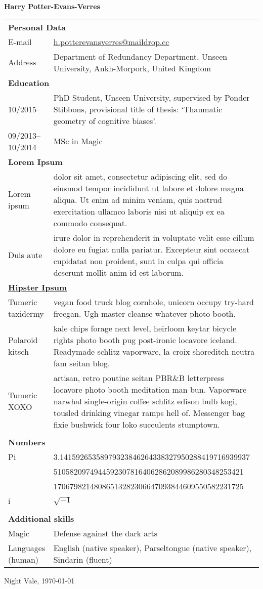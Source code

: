 \documentclass[11pt, a4paper]{article}
\newcommand{\cvpart}[1]{\multicolumn{2}{l}{\textbf{\Large{#1}}} \vspace{.5em} \\}
\newcommand{\entryend}{\vspace{.5em}\\}
\newcommand{\cvpartend}{\vspace{1em}\\}
\begin{document}
\begin{center}
	\textbf{\huge{Harry Potter-Evans-Verres}}
\end{center}
\vspace{.5cm}

\begin{tabular}{l p{}}
\cvpart{Personal Data}
E-mail & \href{mailto:h.potterevansverres@maildrop.cc}{h.potterevansverres@maildrop.cc}\vspace{.5em} \\ 
Address & Department of Redundancy Department, Unseen University, Ankh-Morpork, United Kingdom  \vspace{1em} \\
\cvpart{Education}
10/2015-- & PhD Student, Unseen University, supervised by Ponder Stibbons, provisional title of thesis: `Thaumatic geometry of cognitive biases'.
\entryend

09/2013--10/2014 & MSc in Magic
\cvpartend

\cvpart{Lorem Ipsum}
Lorem ipsum &  dolor sit amet, consectetur adipiscing elit, sed do eiusmod tempor incididunt ut labore et dolore magna aliqua. Ut enim ad minim veniam, quis nostrud exercitation ullamco laboris nisi ut aliquip ex ea commodo consequat. \\
Duis aute & irure dolor in reprehenderit in voluptate velit esse cillum dolore eu fugiat nulla pariatur. Excepteur sint occaecat cupidatat non proident, sunt in culpa qui officia deserunt mollit anim id est laborum.
\cvpartend

\cvpart{\href{https://hipsum.co/}{Hipster Ipsum}}
Tumeric taxidermy &  vegan food truck blog cornhole, unicorn occupy try-hard freegan. Ugh master cleanse whatever photo booth. \entryend
Polaroid kitsch & kale chips forage next level, heirloom keytar bicycle rights photo booth pug post-ironic locavore iceland. Readymade schlitz vaporware, la croix shoreditch neutra fam seitan blog. \\  Tumeric XOXO&  artisan, retro poutine seitan PBR\&B letterpress locavore photo booth meditation man bun. Vaporware narwhal single-origin coffee schlitz edison bulb kogi, tousled drinking vinegar ramps hell of. Messenger bag fixie bushwick four loko succulents stumptown.
\entryend
\cvpartend

\cvpart{Numbers}
Pi & 3.14159265358979323846264338327950288419716939937
\\ & 51058209749445923078164062862089986280348253421
\\ & 17067982148086513282306647093844609550582231725 
\entryend
i & $\sqrt{-1}$ 
\entryend
\cvpartend

\cvpart{Additional skills}
Magic & Defense against the dark arts \entryend
Languages (human) & English (native speaker), Parseltongue (native speaker), Sindarin (fluent)
\cvpartend
\end{tabular}

\vspace{.5cm}
Night Vale, \today
\end{document}
